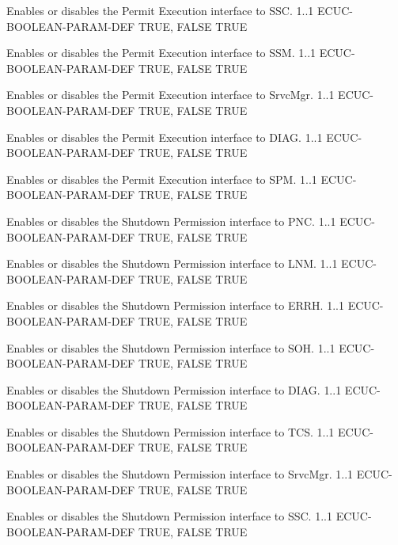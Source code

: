 {
{Enables or disables the Permit Execution interface to SSC.}
{1..1}
{ECUC-BOOLEAN-PARAM-DEF}
{TRUE, FALSE}
{TRUE}}
{}

{
{Enables or disables the Permit Execution interface to SSM.}
{1..1}
{ECUC-BOOLEAN-PARAM-DEF}
{TRUE, FALSE}
{TRUE}}
{}

{Enables or disables the Permit Execution interface to SrvcMgr.}
{1..1}
{ECUC-BOOLEAN-PARAM-DEF}
{TRUE, FALSE}
{TRUE}

{Enables or disables the Permit Execution interface to DIAG.}
{1..1}
{ECUC-BOOLEAN-PARAM-DEF}
{TRUE, FALSE}
{TRUE}

{Enables or disables the Permit Execution interface to SPM.}
{1..1}
{ECUC-BOOLEAN-PARAM-DEF}
{TRUE, FALSE}
{TRUE}

{Enables or disables the Shutdown Permission interface to PNC.}
{1..1}
{ECUC-BOOLEAN-PARAM-DEF}
{TRUE, FALSE}
{TRUE}

{Enables or disables the Shutdown Permission interface to LNM.}
{1..1}
{ECUC-BOOLEAN-PARAM-DEF}
{TRUE, FALSE}
{TRUE}

{Enables or disables the Shutdown Permission interface to ERRH.}
{1..1}
{ECUC-BOOLEAN-PARAM-DEF}
{TRUE, FALSE}
{TRUE}

{Enables or disables the Shutdown Permission interface to SOH.}
{1..1}
{ECUC-BOOLEAN-PARAM-DEF}
{TRUE, FALSE}
{TRUE}

{Enables or disables the Shutdown Permission interface to DIAG.}
{1..1}
{ECUC-BOOLEAN-PARAM-DEF}
{TRUE, FALSE}
{TRUE}

{Enables or disables the Shutdown Permission interface to TCS.}
{1..1}
{ECUC-BOOLEAN-PARAM-DEF}
{TRUE, FALSE}
{TRUE}

{Enables or disables the Shutdown Permission interface to SrvcMgr.}
{1..1}
{ECUC-BOOLEAN-PARAM-DEF}
{TRUE, FALSE}
{TRUE}

{Enables or disables the Shutdown Permission interface to SSC.}
{1..1}
{ECUC-BOOLEAN-PARAM-DEF}
{TRUE, FALSE}
{TRUE}


